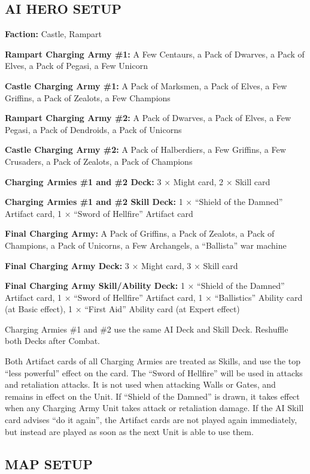 \begin{multicols*}{2}
\subsection*{\MakeUppercase{AI Hero Setup}}

\textbf{Faction:} Castle, Rampart

\textbf{Rampart Charging Army \#1:} A Few Centaurs, a Pack of Dwarves, a Pack of Elves, a Pack of Pegasi, a Few Unicorn

\textbf{Castle Charging Army \#1:} A Pack of Marksmen, a Pack of Elves, a Few Griffins, a Pack of Zealots, a Few Champions

\textbf{Rampart Charging Army \#2:} A Pack of Dwarves, a Pack of Elves, a Few Pegasi, a Pack of Dendroids, a Pack of Unicorns

\textbf{Castle Charging Army \#2:} A Pack of Halberdiers, a Few Griffins, a Few Crusaders, a Pack of Zealots, a Pack of Champions

\textbf{Charging Armies \#1 and \#2 Deck:} 3 × Might card, 2 × Skill card

\textbf{Charging Armies \#1 and \#2 Skill Deck:} 1 × ``Shield of the Damned'' Artifact card, 1 × ``Sword of Hellfire'' Artifact card

\textbf{Final Charging Army:} A Pack of Griffins, a Pack of Zealots, a Pack of Champions, a Pack of Unicorns, a Few Archangels, a ``Ballista'' war machine

\textbf{Final Charging Army Deck:} 3 × Might card, 3 × Skill card

\textbf{Final Charging Army Skill/Ability Deck:} 1 × ``Shield of the Damned'' Artifact card, 1 × ``Sword of Hellfire'' Artifact card,
  1 × ``Ballistics'' Ability card (at Basic effect), 1 × ``First Aid'' Ability card (at Expert effect)

Charging Armies \#1 and \#2 use the same AI Deck and Skill Deck. Reshuffle both Decks after Combat.

Both Artifact cards of all Charging Armies are treated as Skills, and use the top ``less powerful'' effect on the card.
The ``Sword of Hellfire'' will be used in attacks and retaliation attacks. It is not used when attacking Walls or Gates,
and remains in effect on the Unit. If ``Shield of the Damned'' is drawn, it takes effect when
any Charging Army Unit takes attack or retaliation damage. If the AI Skill card advises ``do it again'', the Artifact
cards are not played again immediately, but instead are played as soon as the next Unit is able to use them.

\subsection*{\MakeUppercase{Map Setup}}


\end{multicols*}
